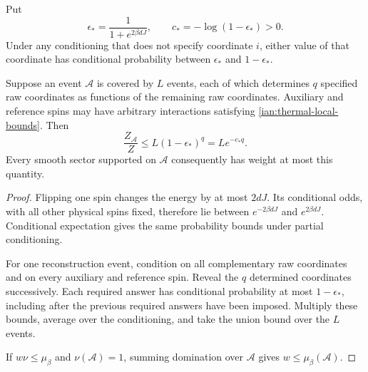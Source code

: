 \begin{lemma}
\label{ian:thermal-reconstruction-obstruction}
Put
\[
 \epsilon_*=\frac1{1+e^{2\beta dJ}},
 \qquad c_*=-\log(1-\epsilon_*)>0.
 \tag{36.3}
\]
Under any conditioning that does not specify coordinate \(i\), either
value of that coordinate has conditional probability between
\(\epsilon_*\) and \(1-\epsilon_*\).

Suppose an event \(\mathcal A\) is covered by \(L\) events, each of which
determines \(q\) specified raw coordinates as functions of the remaining
raw coordinates. Auxiliary and reference spins may have arbitrary
interactions satisfying \eqref{ian:thermal-local-bounds}. Then
\[
 \frac{Z_{\mathcal A}}{Z}\le L(1-\epsilon_*)^q=L e^{-c_*q}.
 \tag{36.4}
\]
Every smooth sector supported on \(\mathcal A\) consequently has weight at most
this quantity.
\end{lemma}

\begin{proof}
Flipping one spin changes the energy by at most \(2dJ\). Its conditional
odds, with all other physical spins fixed, therefore lie between
\(e^{-2\beta dJ}\) and \(e^{2\beta dJ}\). Conditional expectation gives
the same probability bounds under partial conditioning.

For one reconstruction event, condition on all complementary raw
coordinates and on every auxiliary and reference spin. Reveal the
\(q\) determined coordinates successively. Each required answer has
conditional probability at most \(1-\epsilon_*\), including after the
previous required answers have been imposed. Multiply these bounds,
average over the conditioning, and take the union bound over the
\(L\) events.

If \(w\nu\le\mu_\beta\) and \(\nu(\mathcal A)=1\), summing domination over \(\mathcal A\)
gives \(w\le\mu_\beta(\mathcal A)\).
\end{proof}

